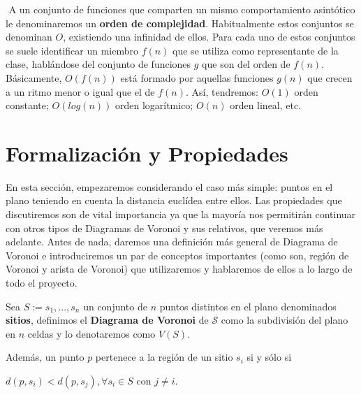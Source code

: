 \begin{definicion} $\label{orden}$
    A un conjunto de funciones que comparten un mismo comportamiento asintótico le denominaremos un \textbf{orden de complejidad}. Habitualmente estos conjuntos se denominan $O$, existiendo una infinidad de ellos. Para cada uno de estos conjuntos se suele identificar un miembro $f(n)$ que se utiliza como representante de la clase, hablándose del conjunto de funciones $g$ que son del orden de $f(n)$. Básicamente, $O(f(n))$ está formado por aquellas funciones $g(n)$ que crecen a un ritmo menor o igual que el de $f(n)$. Así, tendremos: $O(1)$ orden constante; $O(log(n))$ orden logarítmico; $O(n)$ orden lineal, etc.
\end{definicion}

\section{Formalización y Propiedades}

En esta sección, empezaremos considerando el caso más simple: puntos en el plano teniendo en cuenta la distancia euclídea entre ellos. Las propiedades que discutiremos son de vital importancia ya que la mayoría nos permitirán continuar con otros tipos de Diagramas de Voronoi y sus relativos, que veremos más adelante. Antes de nada, daremos una definición más general de Diagrama de Voronoi e introduciremos un par de conceptos importantes (como son, región de Voronoi y arista de Voronoi) que utilizaremos y hablaremos de ellos a lo largo de todo el proyecto. 
\vspace{0.3cm}

Sea $S:={s_{1},...,s_{n}}$ un conjunto de $n$ puntos distintos en el plano denominados \textbf{sitios}, definimos el \textbf{Diagrama de Voronoi} de $\mathcal{S}$ como la subdivisión del plano en $n$ celdas y lo denotaremos como $\mathit{V(S)}$.

Además, un punto $p$ pertenece a la región de un sitio $s_{i}$ si y sólo si 
\begin{center} $d(p,s_{i}) < d(p,s_{j}) , \forall s_{i} \in S$ con  $j \neq i$. \end{center}
\vspace{0.3cm}

